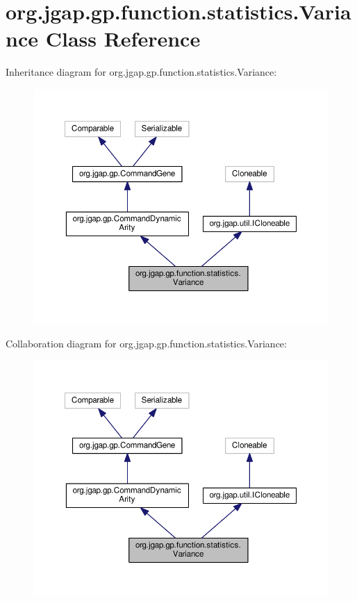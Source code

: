 \hypertarget{classorg_1_1jgap_1_1gp_1_1function_1_1statistics_1_1_variance}{\section{org.\-jgap.\-gp.\-function.\-statistics.\-Variance Class Reference}
\label{classorg_1_1jgap_1_1gp_1_1function_1_1statistics_1_1_variance}
}


Inheritance diagram for org.\-jgap.\-gp.\-function.\-statistics.\-Variance\-:
\nopagebreak
\begin{figure}[H]
\begin{center}
\leavevmode
\includegraphics[width=350pt]{classorg_1_1jgap_1_1gp_1_1function_1_1statistics_1_1_variance__inherit__graph}
\end{center}
\end{figure}


Collaboration diagram for org.\-jgap.\-gp.\-function.\-statistics.\-Variance\-:
\nopagebreak
\begin{figure}[H]
\begin{center}
\leavevmode
\includegraphics[width=350pt]{classorg_1_1jgap_1_1gp_1_1function_1_1statistics_1_1_variance__coll__graph}
\end{center}
\end{figure}
